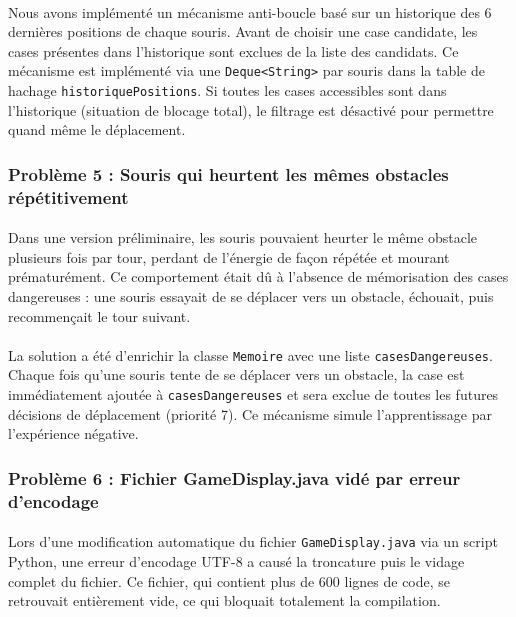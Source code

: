 \paragraph{} Nous avons implémenté un mécanisme anti-boucle basé sur un historique des 6 dernières positions de chaque souris. Avant de choisir une case candidate, les cases présentes dans l'historique sont exclues de la liste des candidats. Ce mécanisme est implémenté via une \texttt{Deque<String>} par souris dans la table de hachage \texttt{historiquePositions}. Si toutes les cases accessibles sont dans l'historique (situation de blocage total), le filtrage est désactivé pour permettre quand même le déplacement.

\subsubsection{Problème 5 : Souris qui heurtent les mêmes obstacles répétitivement}

\paragraph{} Dans une version préliminaire, les souris pouvaient heurter le même obstacle plusieurs fois par tour, perdant de l'énergie de façon répétée et mourant prématurément. Ce comportement était dû à l'absence de mémorisation des cases dangereuses : une souris essayait de se déplacer vers un obstacle, échouait, puis recommençait le tour suivant.

\paragraph{} La solution a été d'enrichir la classe \texttt{Memoire} avec une liste \texttt{casesDangereuses}. Chaque fois qu'une souris tente de se déplacer vers un obstacle, la case est immédiatement ajoutée à \texttt{casesDangereuses} et sera exclue de toutes les futures décisions de déplacement (priorité 7). Ce mécanisme simule l'apprentissage par l'expérience négative.

\subsubsection{Problème 6 : Fichier GameDisplay.java vidé par erreur d'encodage}

\paragraph{} Lors d'une modification automatique du fichier \texttt{GameDisplay.java} via un script Python, une erreur d'encodage UTF-8 a causé la troncature puis le vidage complet du fichier. Ce fichier, qui contient plus de 600 lignes de code, se retrouvait entièrement vide, ce qui bloquait totalement la compilation.

